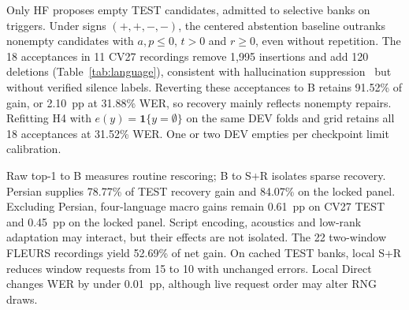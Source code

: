 
Only HF proposes empty TEST candidates, admitted to selective banks on triggers. Under signs $(+,+,-,-)$, the centered abstention baseline outranks nonempty candidates with $a, p \le 0$, $t > 0$ and $r \ge 0$, even without repetition. The 18 acceptances in 11 CV27 recordings remove 1,995 insertions and add 120 deletions (Table~\ref{tab:language}), consistent with hallucination suppression~\cite{baranski2025nonspeech} but without verified silence labels. Reverting these acceptances to B retains 91.52\% of gain, or 2.10~pp at 31.88\% WER, so recovery mainly reflects nonempty repairs. Refitting H4 with $e(y)=\mathbf1\{y=\emptyset\}$ on the same DEV folds and grid retains all 18 acceptances at 31.52\% WER. One or two DEV empties per checkpoint limit calibration.

Raw top-1 to B measures routine rescoring; B to S+R isolates sparse recovery. Persian supplies 78.77\% of TEST recovery gain and 84.07\% on the locked panel. Excluding Persian, four-language macro gains remain 0.61~pp on CV27 TEST and 0.45~pp on the locked panel. Script encoding, acoustics and low-rank adaptation may interact, but their effects are not isolated. The 22 two-window FLEURS recordings yield 52.69\% of net gain. On cached TEST banks, local S+R reduces window requests from 15 to 10 with unchanged errors. Local Direct changes WER by under 0.01~pp, although live request order may alter RNG draws.
